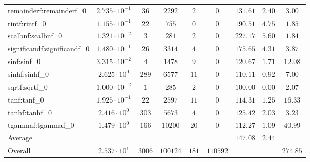 \begin{tabular}{|l|c|c|c|c|c|c|c|c|}
remainderf:remainderf\_0     & $ 2.735 \cdot 10^{-1} $ & $ 36     $ & $ 2292   $ & $ 2   $ & $ 0      $ & $ 131.61      $ & $ 2.40    $ & $ 3.00    $ \\
rintf:rintf\_0               & $ 1.155 \cdot 10^{-1} $ & $ 22     $ & $ 755    $ & $ 0   $ & $ 0      $ & $ 190.51      $ & $ 4.75    $ & $ 1.85    $ \\
scalbnf:scalbnf\_0           & $ 1.321 \cdot 10^{-2} $ & $ 3      $ & $ 281    $ & $ 2   $ & $ 0      $ & $ 227.17      $ & $ 5.60    $ & $ 1.84    $ \\
significandf:significandf\_0 & $ 1.480 \cdot 10^{-1} $ & $ 26     $ & $ 3314   $ & $ 4   $ & $ 0      $ & $ 175.65      $ & $ 4.31    $ & $ 3.87    $ \\
sinf:sinf\_0                 & $ 3.315 \cdot 10^{-2} $ & $ 4      $ & $ 1478   $ & $ 9   $ & $ 0      $ & $ 120.67      $ & $ 1.71    $ & $ 12.08   $ \\
sinhf:sinhf\_0               & $ 2.625 \cdot 10^{0}  $ & $ 289    $ & $ 6577   $ & $ 11  $ & $ 0      $ & $ 110.11      $ & $ 0.92    $ & $ 7.00    $ \\
sqrtf:sqrtf\_0               & $ 1.000 \cdot 10^{-2} $ & $ 1      $ & $ 285    $ & $ 2   $ & $ 0      $ & $ 100.00      $ & $ 0.00    $ & $ 2.07    $ \\
tanf:tanf\_0                 & $ 1.925 \cdot 10^{-1} $ & $ 22     $ & $ 2597   $ & $ 11  $ & $ 0      $ & $ 114.31      $ & $ 1.25    $ & $ 16.33   $ \\
tanhf:tanhf\_0               & $ 2.416 \cdot 10^{0}  $ & $ 303    $ & $ 5673   $ & $ 4   $ & $ 0      $ & $ 125.42      $ & $ 2.03    $ & $ 3.23    $ \\
tgammaf:tgammaf\_0           & $ 1.479 \cdot 10^{0}  $ & $ 166    $ & $ 10200  $ & $ 20  $ & $ 0      $ & $ 112.27      $ & $ 1.09    $ & $ 40.99   $ \\
\hline
Average                      & $                     $ & $        $ & $        $ & $     $ & $        $ & $ 147.08      $ & $ 2.44    $ & $         $ \\
\hline
Overall                      & $ 2.537 \cdot 10^{1}  $ & $ 3006   $ & $ 100124 $ & $ 181 $ & $ 110592 $ & $             $ & $         $ & $ 274.85  $ \\
\hline
\end{tabular}
